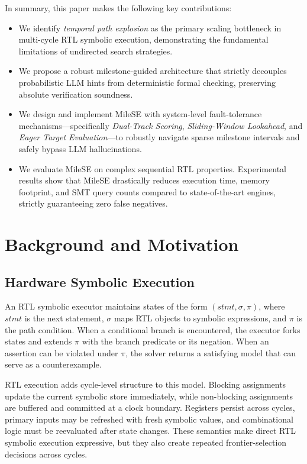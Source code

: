 \documentclass[conference]{IEEEtran}
\begin{document}
In summary, this paper makes the following key contributions:
\begin{itemize}
    \item We identify \textit{temporal path explosion} as the primary scaling bottleneck in multi-cycle RTL symbolic execution, demonstrating the fundamental limitations of undirected search strategies.
    \item We propose a robust milestone-guided architecture that strictly decouples probabilistic LLM hints from deterministic formal checking, preserving absolute verification soundness.
    \item We design and implement MileSE with system-level fault-tolerance mechanisms—specifically \textit{Dual-Track Scoring}, \textit{Sliding-Window Lookahead}, and \textit{Eager Target Evaluation}—to robustly navigate sparse milestone intervals and safely bypass LLM hallucinations.
    \item We evaluate MileSE on complex sequential RTL properties. Experimental results show that MileSE drastically reduces execution time, memory footprint, and SMT query counts compared to state-of-the-art engines, strictly guaranteeing zero false negatives.
\end{itemize}



\section{Background and Motivation}
\label{sec:background}

\subsection{Hardware Symbolic Execution}
An RTL symbolic executor maintains states of the form $(stmt,\sigma,\pi)$, where $stmt$ is the next statement, $\sigma$ maps RTL objects to symbolic expressions, and $\pi$ is the path condition. When a conditional branch is encountered, the executor forks states and extends $\pi$ with the branch predicate or its negation. When an assertion can be violated under $\pi$, the solver returns a satisfying model that can serve as a counterexample.

RTL execution adds cycle-level structure to this model. Blocking assignments update the current symbolic store immediately, while non-blocking assignments are buffered and committed at a clock boundary. Registers persist across cycles, primary inputs may be refreshed with fresh symbolic values, and combinational logic must be reevaluated after state changes. These semantics make direct RTL symbolic execution expressive, but they also create repeated frontier-selection decisions across cycles.
\end{document}
